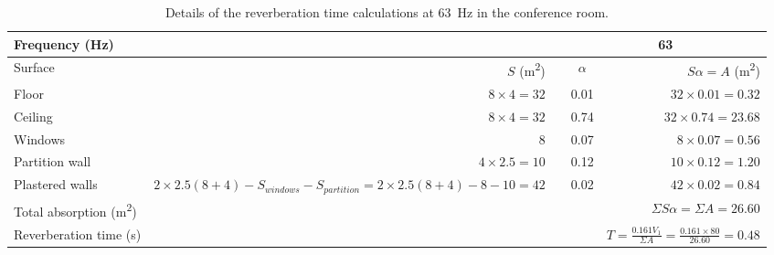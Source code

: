 \begin{sidewaystable}[htbp]
	\caption{Details of the reverberation time calculations at 63~Hz in the conference room.}
	\label{tbl:reverb_conf_example}
	\centering
	\begin{tabular}{@{}lrrrr@{}}
		\toprule
		Frequency (Hz) & \multicolumn{1}{l}{} & \multicolumn{1}{c}{} & \multicolumn{2}{c}{63} \\ \midrule
		Surface & $S$ (m\textsuperscript{2}) & \multicolumn{1}{l}{} & \multicolumn{1}{c}{$\alpha$} & $S \alpha = A$ (m\textsuperscript{2}) \\
		Floor & $8 \times 4 = 32$ &  & 0.01 & $32 \times 0.01 = 0.32$ \\
		Ceiling & $8 \times 4 = 32$ &  & 0.74 & $32 \times 0.74 = 23.68$ \\
		Windows & 8 &  & 0.07 & $8 \times 0.07 = 0.56$ \\
		Partition wall & $4 \times 2.5 = 10$ &  & 0.12 & $10 \times 0.12 = 1.20$ \\
		Plastered walls & $2 \times 2.5 (8 + 4) - S_{windows} - S_{partition} = 2 \times 2.5 (8 + 4) - 8 - 10 = 42$ &  & 0.02 & $42 \times 0.02 = 0.84$ \\ \midrule
		Total absorption (m\textsuperscript{2}) &  &  &  & $\Sigma S \alpha = \Sigma A = 26.60$ \\
		Reverberation time (s) &  &  &  & $T = \frac{0.161 V_{1}}{\Sigma A} = \frac{0.161 \times 80}{26.60} = 0.48$ \\ \bottomrule
	\end{tabular}
\end{sidewaystable}